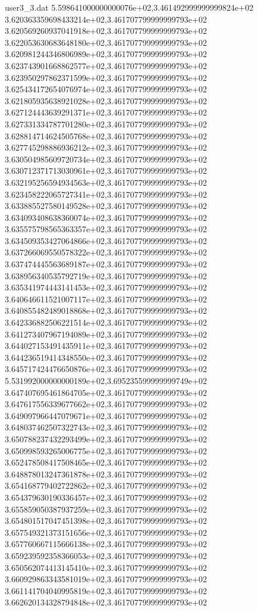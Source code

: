 \begin{filecontents}{user3_3.dat}
5.598641000000000076e+02,3.461492999999999824e+02
3.620363359698433214e+02,3.461707799999999793e+02
3.620569260937041918e+02,3.461707799999999793e+02
3.622053630683648180e+02,3.461707799999999793e+02
3.620981244346806989e+02,3.461707799999999793e+02
3.623743901668862577e+02,3.461707799999999793e+02
3.623950297862371599e+02,3.461707799999999793e+02
3.625434172654076974e+02,3.461707799999999793e+02
3.621805935638921028e+02,3.461707799999999793e+02
3.627124443639291371e+02,3.461707799999999793e+02
3.627331334787701280e+02,3.461707799999999793e+02
3.628814714624505768e+02,3.461707799999999793e+02
3.627745298886936212e+02,3.461707799999999793e+02
3.630504985609720734e+02,3.461707799999999793e+02
3.630712371713030961e+02,3.461707799999999793e+02
3.632195256594934563e+02,3.461707799999999793e+02
3.623458222065727341e+02,3.461707799999999793e+02
3.633885527580149528e+02,3.461707799999999793e+02
3.634093408638360074e+02,3.461707799999999793e+02
3.635575798565363357e+02,3.461707799999999793e+02
3.634509353427064866e+02,3.461707799999999793e+02
3.637266069550578322e+02,3.461707799999999793e+02
3.637474445563689187e+02,3.461707799999999793e+02
3.638956340535792719e+02,3.461707799999999793e+02
3.635341974443141453e+02,3.461707799999999793e+02
3.640646611521007117e+02,3.461707799999999793e+02
3.640855482489018868e+02,3.461707799999999793e+02
3.642336882506221514e+02,3.461707799999999793e+02
3.641273407967194089e+02,3.461707799999999793e+02
3.644027153491435911e+02,3.461707799999999793e+02
3.644236519414348550e+02,3.461707799999999793e+02
3.645717424476650876e+02,3.461707799999999793e+02
5.531992000000000189e+02,3.695235599999999749e+02
3.647407695461864705e+02,3.461707799999999793e+02
3.647617556339677662e+02,3.461707799999999793e+02
3.649097966447079671e+02,3.461707799999999793e+02
3.648037462507322743e+02,3.461707799999999793e+02
3.650788237432293499e+02,3.461707799999999793e+02
3.650998593265006775e+02,3.461707799999999793e+02
3.652478508417508465e+02,3.461707799999999793e+02
3.648878013247361878e+02,3.461707799999999793e+02
3.654168779402722862e+02,3.461707799999999793e+02
3.654379630190336457e+02,3.461707799999999793e+02
3.655859050387937259e+02,3.461707799999999793e+02
3.654801517047451398e+02,3.461707799999999793e+02
3.657549321373151656e+02,3.461707799999999793e+02
3.657760667115666138e+02,3.461707799999999793e+02
3.659239592358366053e+02,3.461707799999999793e+02
3.650562074413145410e+02,3.461707799999999793e+02
3.660929863343581019e+02,3.461707799999999793e+02
3.661141704040995819e+02,3.461707799999999793e+02
3.662620134328794848e+02,3.461707799999999793e+02

\end{filecontents}
